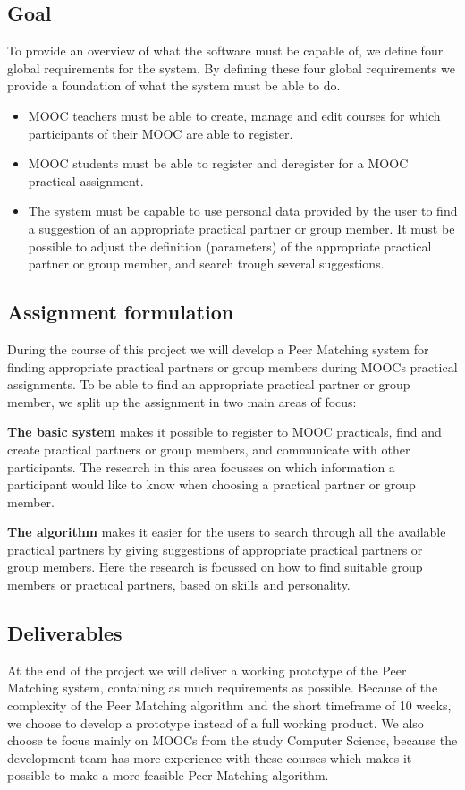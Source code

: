 \documentclass[]{article}
\begin{document}
\subsection{Goal}
To provide an overview of what the software must be capable of, we define four global requirements for the system.
By defining these four global requirements we provide a foundation of what the system must be able to do.
\begin{itemize}
\item MOOC teachers must be able to create, manage and edit courses for which participants of their MOOC are able to register.

\item MOOC students must be able to register and deregister for a MOOC practical assignment.

\item The system must be capable to use personal data provided by the user to find a suggestion of an appropriate practical partner or group member.
It must be possible to adjust the definition (parameters) of the appropriate practical partner or group member, and search trough several suggestions.
\end{itemize}

\subsection{Assignment formulation}
During the course of this project we will develop a Peer Matching system for finding appropriate practical partners or group members during MOOCs practical assignments.
To be able to find an appropriate practical partner or group member, we split up the assignment in two main areas of focus:

\textbf{The basic system} makes it possible to register to MOOC practicals, find and create practical partners or group members, and communicate with other participants.
The research in this area focusses on which information a participant would like to know when choosing a practical partner or group member.

\textbf{The algorithm} makes it easier for the users to search through all the available practical partners by giving suggestions of appropriate practical partners or group members.
Here the research is focussed on how to find suitable group members or practical partners, based on skills and personality.

\subsection{Deliverables}
At the end of the project we will deliver a working prototype of the Peer Matching system, containing as much requirements as possible.
Because of the complexity of the Peer Matching algorithm and the short timeframe of 10 weeks, we choose to develop a prototype instead of a full working product.
We also choose te focus mainly on MOOCs from the study Computer Science, because the development team has more experience with these courses which makes it possible to make a more feasible Peer Matching algorithm.
\end{document}

